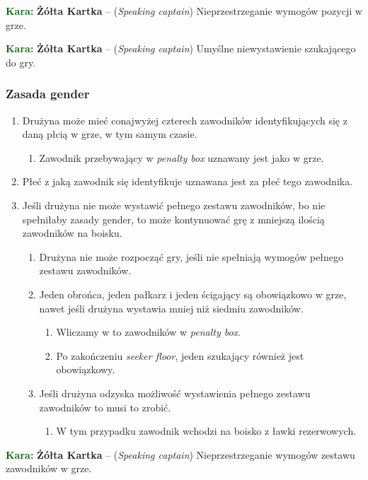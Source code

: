 \documentclass[11pt,a4paper]{article}
\newcommand\yellowcard[1]{\bgroup\textcolor{darkgreen}{\textbf{Kara: }}\bgroup\textcolor{darkyellow}{\textbf{Żółta Kartka}} -- #1}
\begin{document}
\yellowcard{(\emph{Speaking captain}) Nieprzestrzeganie wymogów pozycji w grze.}

\yellowcard{(\emph{Speaking captain}) Umyślne niewystawienie szukającego do gry.}

\subsubsection{Zasada gender}
\begin{enumerate}
  \item Drużyna może mieć conajwyżej czterech zawodników identyfikujących się z daną płcią w grze, w tym samym czasie.
  \begin{enumerate}
    \item Zawodnik przebywający w \emph{penalty box} uznawany jest jako w grze.
  \end{enumerate}

  \item Płeć z jaką zawodnik się identyfikuje uznawana jest za płeć tego zawodnika.

  \item Jeśli drużyna nie może wystawić pełnego zestawu zawodników, bo nie spełniłaby zasady gender, to może kontynuować grę z mniejszą ilością zawodników na boisku.
  \begin{enumerate}
    \item Drużyna nie może rozpocząć gry, jeśli nie spełniają wymogów pełnego zestawu zawodników.
    \item Jeden obrońca, jeden pałkarz i jeden ścigający są obowiązkowo w grze, nawet jeśli drużyna wystawia mniej niż siedmiu zawodników.
    \begin{enumerate}
      \item Wliczamy w to zawodników w \emph{penalty box}.
      \item Po zakończeniu \emph{seeker floor}, jeden szukający również jest obowiązkowy.
    \end{enumerate}
    \item Jeśli drużyna odzyska możliwość wystawienia pełnego zestawu zawodników to musi to zrobić.
    \begin{enumerate}
      \item W tym przypadku zawodnik wchodzi na boisko z ławki rezerwowych.
    \end{enumerate}
  \end{enumerate}
\end{enumerate}

\yellowcard{(\emph{Speaking captain}) Nieprzestrzeganie wymogów zestawu zawodników w grze.}
\end{document}
